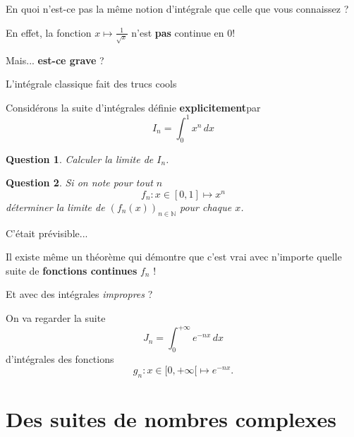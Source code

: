 \documentclass{beamer}
\newcommand{\NN}{\mathbb N}
\theoremstyle{plain}
\newtheorem{ques}{Question}
\begin{document}
\begin{frame}
En quoi n'est-ce pas la même notion d'intégrale que celle que vous connaissez ?\pause

En effet, la fonction $x\longmapsto \frac{1}{\sqrt x}$ n'est \textbf{pas} continue en 0!

Mais... \textbf{est-ce grave} ?
\end{frame}

\begin{frame}{L'intégrale classique fait des trucs cools}

Considérons la suite d'intégrales définie \textbf{explicitement}\footnotemark par
\[
	I_n = \int_0^1 x^n\,dx
\]\pause

\begin{ques}
Calculer la limite de $I_n$.
\end{ques}


\end{frame}

\begin{frame}

\begin{ques}
	Si on note pour tout $n$ 
	\[
	f_n\colon x\in[0,1] \longmapsto x^n
	\]
	déterminer la limite de $\left(f_n(x)\right)_{n\in\NN}$ pour chaque $x$.
\end{ques}

\end{frame}


\begin{frame}
C'était prévisible...\pause

Il existe même un théorème qui démontre que c'est vrai avec n'importe quelle suite de \textbf{fonctions continues} $f_n$ !\footnotemark 

\end{frame}

\begin{frame}{Et avec des intégrales \textit{impropres} ?}

On va regarder la suite
\[
J_n = \int_0^{+\infty} e^{-nx}\, dx
\]
d'intégrales des fonctions
\[
	g_n\colon x\in {[0,+\infty[} \longmapsto e^{-nx}.
\]
\end{frame}

\section*{Des suites de nombres complexes}

\begin{frame}
	
\end{frame}
\end{document}
